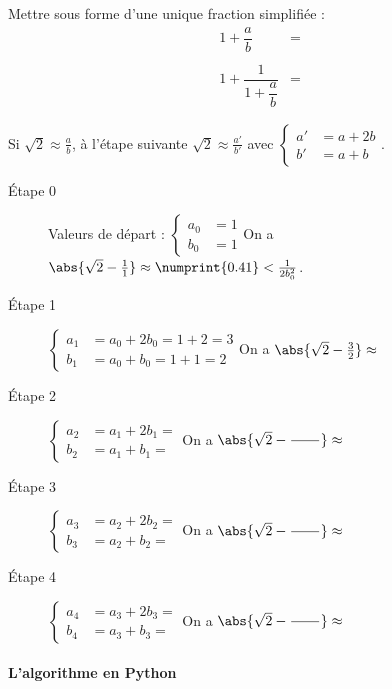 \begin{exercise} Mettre sous forme d'une unique fraction simplifiée :
	\begin{align*}
		1+\dfrac{a}{b}& =\\ \\
		1+\dfrac{1}{1+\dfrac{a}{b}}& =
	\end{align*} 
\end{exercise}
\begin{mdframed}
	Si $\sqrt{2}\approx \frac{a}{b}$, à l'étape suivante $\sqrt{2}\approx\frac{a'}{b'}$ avec $\begin{cases}
		a'&= a+2b\\
		b'&=a+ b
	\end{cases}$.
\end{mdframed}
\begin{description}
	\item[Étape 0] Valeurs de départ : $\begin{cases}
		a_0&=1\\
		b_0&=1
	\end{cases}$\hfill  On a $\abs{\sqrt{2}- \frac{1}{1}}\approx \numprint{0.41}<\frac{1}{2b_0^2}$. 
	\item[Étape 1]  $\begin{cases}
		a_1&=a_0+2b_0=1+2=3\\
		b_1&=a_0+b_0=1+1=2
	\end{cases}$\hfill  On a $\abs{\sqrt{2}-\frac{3}{2}}\approx\qquad\qquad\qquad $
	\item[Étape 2]  $\begin{cases}
	a_2&=a_1+2b_1= \\
	b_2&=a_1+b_1= 
\end{cases}$\hfill  On a $\abs{\sqrt{2}-\frac{\qquad}{\qquad}}\approx\qquad\qquad\qquad $
	\item[Étape 3]  $\begin{cases}
	a_3&=a_2+2b_2= \\
	b_3&=a_2+b_2= 
\end{cases}$\hfill  On a $\abs{\sqrt{2}-\frac{\qquad}{\qquad}}\approx\qquad\qquad\qquad $
	\item[Étape 4]  $\begin{cases}
	a_4&=a_3+2b_3= \\
	b_4&=a_3+b_3= 
\end{cases}$\hfill  On a $\abs{\sqrt{2}-\frac{\qquad}{\qquad}}\approx\qquad\qquad\qquad $
\end{description}


\paragraph{L'algorithme en Python}\hfill 
 
